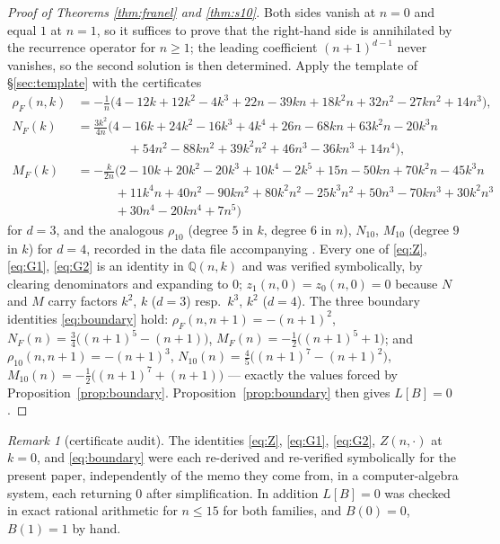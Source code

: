 \documentclass[11pt,reqno]{amsart}
\theoremstyle{plain}
\theoremstyle{definition}
\theoremstyle{remark}
\newtheorem{remark}[theorem]{Remark}
\newcommand{\Q}{\mathbb{Q}}
\numberwithin{equation}{section}
\begin{document}
\begin{proof}[Proof of Theorems \ref{thm:franel} and \ref{thm:s10}]
Both sides vanish at $n=0$ and equal $1$ at $n=1$, so it suffices to prove that the right-hand
side is annihilated by the recurrence operator for $n\ge1$; the leading coefficient
$(n+1)^{d-1}$ never vanishes, so the second solution is then determined. Apply the template
of \S\ref{sec:template} with the certificates
\begin{align*}
 \rho_F(n,k)&=-\tfrac1n\bigl(4-12k+12k^2-4k^3+22n-39kn+18k^2n+32n^2-27kn^2+14n^3\bigr),\\
 N_F(k)&=\tfrac{3k^2}{4n}\bigl(4-16k+24k^2-16k^3+4k^4+26n-68kn+63k^2n-20k^3n\\
    &\qquad\qquad+54n^2-88kn^2+39k^2n^2+46n^3-36kn^3+14n^4\bigr),\\
 M_F(k)&=-\tfrac{k}{2n}\bigl(2-10k+20k^2-20k^3+10k^4-2k^5+15n-50kn+70k^2n-45k^3n\\
    &\qquad\quad+11k^4n+40n^2-90kn^2+80k^2n^2-25k^3n^2+50n^3-70kn^3+30k^2n^3\\
    &\qquad\quad+30n^4-20kn^4+7n^5\bigr)
\end{align*}
for $d=3$, and the analogous $\rho_{10}$ (degree $5$ in $k$, degree $6$ in $n$), $N_{10}$,
$M_{10}$ (degree $9$ in $k$) for $d=4$, recorded in the data file accompanying
\cite{MinimalFormMemo}. Every one of \eqref{eq:Z}, \eqref{eq:G1}, \eqref{eq:G2} is an identity
in $\Q(n,k)$ and was verified symbolically, by clearing denominators and expanding to $0$;
$z_1(n,0)=z_0(n,0)=0$ because $N$ and $M$ carry factors $k^2$, $k$ ($d=3$) resp.\ $k^3$,
$k^2$ ($d=4$). The three boundary identities \eqref{eq:boundary} hold:
$\rho_F(n,n+1)=-(n+1)^2$, $N_F(n)=\tfrac34\bigl((n+1)^5-(n+1)\bigr)$,
$M_F(n)=-\tfrac12\bigl((n+1)^5+1\bigr)$; and $\rho_{10}(n,n+1)=-(n+1)^3$,
$N_{10}(n)=\tfrac45\bigl((n+1)^7-(n+1)^2\bigr)$,
$M_{10}(n)=-\tfrac12\bigl((n+1)^7+(n+1)\bigr)$ --- exactly the values forced by
Proposition~\ref{prop:boundary}. Proposition~\ref{prop:boundary} then gives $L[B]=0$.
\end{proof}

\begin{remark}[certificate audit]\label{rem:audit}
The identities \eqref{eq:Z}, \eqref{eq:G1}, \eqref{eq:G2}, $Z(n,\cdot)$ at $k=0$, and
\eqref{eq:boundary} were each re-derived and re-verified symbolically for the present paper,
independently of the memo they come from, in a computer-algebra system, each returning $0$
after simplification. In addition $L[B]=0$ was checked in exact rational arithmetic for
$n\le15$ for both families, and $B(0)=0$, $B(1)=1$ by hand.
\end{remark}
\end{document}
